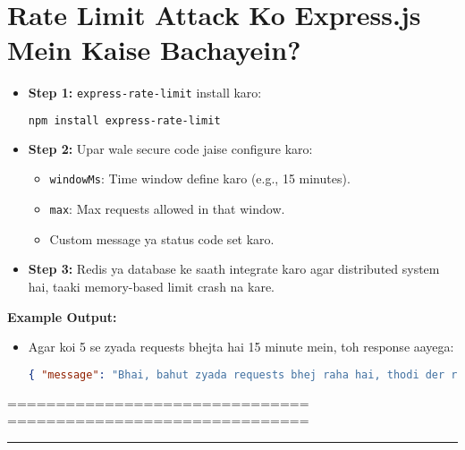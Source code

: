 \documentclass[a4paper, 12pt]{article}
\begin{document}
\section{Rate Limit Attack Ko Express.js Mein Kaise Bachayein?}
\begin{itemize}
    \item \textbf{\color{keyconceptgreen}Step 1:} \texttt{express-rate-limit} install karo:
    \begin{lstlisting}[language=bash]
npm install express-rate-limit
    \end{lstlisting}
    
    \item \textbf{\color{keyconceptgreen}Step 2:} Upar wale secure code jaise configure karo:
    \begin{itemize}
        \item \texttt{windowMs}: Time window define karo (e.g., 15 minutes).
        \item \texttt{max}: Max requests allowed in that window.
        \item Custom message ya status code set karo.
    \end{itemize}
    
    \item \textbf{\color{keyconceptgreen}Step 3:} Redis ya database ke saath integrate karo agar distributed system hai, taaki memory-based limit crash na kare.
\end{itemize}

\textbf{\color{importantred}Example Output:}
\begin{itemize}
    \item Agar koi 5 se zyada requests bhejta hai 15 minute mein, toh response aayega:
    \begin{lstlisting}[language=json]
{ "message": "Bhai, bahut zyada requests bhej raha hai, thodi der ruk!" }
    \end{lstlisting}
\end{itemize}

===============================
===============================
\hrule



\setlength{\parindent}{0pt}
\setlength{\parskip}{1em}

\end{document}
